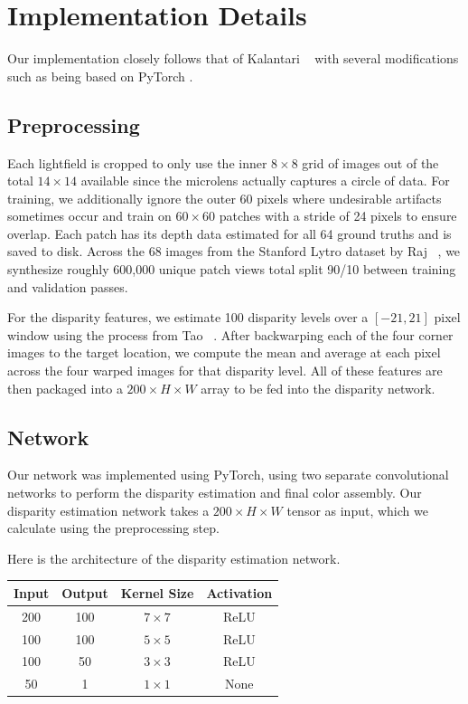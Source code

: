\documentclass[10pt,twocolumn,letterpaper]{article}
\begin{document}
\section{Implementation Details}

Our implementation closely follows that of Kalantari \etal~\cite{LearningViewSynthesis} with several modifications such
as being based on PyTorch \cite{PyTorch}.

\subsection{Preprocessing}

Each lightfield is cropped to only use the inner $8 \times 8$ grid of images out of the total $14 \times 14$ available
since the microlens actually captures a circle of data. For training, we additionally ignore the outer 60 pixels where
undesirable artifacts sometimes occur and train on $60\times60$ patches with a stride of 24 pixels to ensure overlap.
Each patch has its depth data estimated for all 64 ground truths and is saved to disk. Across the 68 images from the
Stanford Lytro dataset by Raj \etal~\cite{StanfordLytro}, we synthesize roughly 600,000 unique patch views total split
90/10 between training and validation passes.

For the disparity features, we estimate 100 disparity levels over a $[-21, 21]$ pixel window using the process from Tao \etal~\cite{tao2013depth}.
After backwarping each of the four corner images to the target location, we compute the mean and average at each pixel across the four warped images
for that disparity level. All of these features are then packaged into a $200 \times H \times W$ array to be fed into the disparity network.

\subsection{Network}

Our network was implemented using PyTorch, using two separate convolutional networks to perform the
disparity estimation and final color assembly. Our disparity estimation network takes a 
$200 \times H \times W$ tensor as input, which we calculate using the preprocessing step.

Here is the architecture of the disparity estimation network.

\begin{center}
\begin{tabular}{|c c c c|}
    \hline
    Input & Output & Kernel Size & Activation \\
    \hline
    200 & 100 & $7 \times 7$ & ReLU \\
    100 & 100 & $5 \times 5$ & ReLU \\
    100 & 50 & $3 \times 3$ & ReLU \\
    50 & 1 & $1 \times 1$ & None \\
    \hline
\end{tabular}
\end{center}
\end{document}

